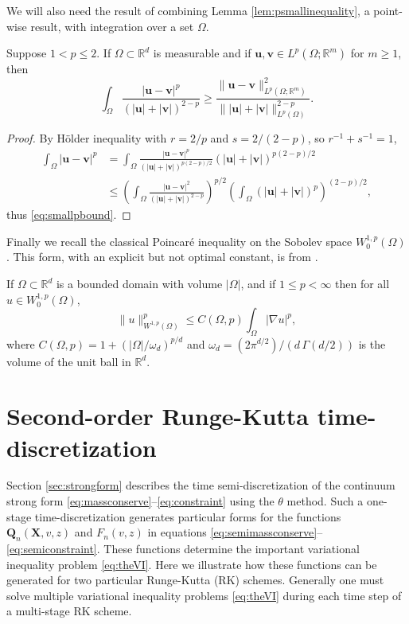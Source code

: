\documentclass[final,onefignum]{siamart190516}
\newcommand\bu{\mathbf{u}}
\newcommand\bv{\mathbf{v}}
\newcommand\bQ{\mathbf{Q}}
\newcommand\bX{\mathbf{X}}
\newcommand{\grad}{\nabla}
\newcommand\RR{\mathbb{R}}
\begin{document}
We will also need the result of combining Lemma \ref{lem:psmallinequality}, a point-wise result, with integration over a set $\Omega$.

\begin{lemma} \label{lem:smallpbound}  Suppose $1<p\le 2$.  If $\Omega \subset \RR^d$ is measurable and if $\bu,\bv\in L^p(\Omega; \RR^m)$ for $m\ge 1$, then
\begin{equation}
    \int_\Omega \frac{|\bu-\bv|^p}{\left(|\bu|+|\bv|\right)^{2-p}} \ge \frac{\|\bu-\bv\|_{L^p(\Omega; \RR^m)}^2}{\big\||\bu|+|\bv|\big\|_{L^p(\Omega)}^{2-p}}. \label{eq:smallpbound}
\end{equation}
\end{lemma}

\begin{proof}  By H\"older inequality with $r=2/p$ and $s=2/(2-p)$, so $r^{-1}+s^{-1}=1$,
\begin{align*}
\int_\Omega |\bu - \bv|^p &= \int_\Omega \frac{|\bu-\bv|^p}{\left(|\bu|+|\bv|\right)^{p(2-p)/2}} \left(|\bu|+|\bv|\right)^{p(2-p)/2} \\
    &\le \left(\int_\Omega \frac{|\bu-\bv|^2}{\left(|\bu|+|\bv|\right)^{2-p}}\right)^{p/2} \left(\int_\Omega \left(|\bu|+|\bv|\right)^p\right)^{(2-p)/2},
\end{align*}
thus \eqref{eq:smallpbound}.
\end{proof}

Finally we recall the classical Poincar\'e inequality on the Sobolev space $W_0^{1,p}(\Omega)$.  This form, with an explicit but not optimal constant, is from \cite[section 7.8]{GilbargTrudinger2001}.

\begin{lemma} \label{lem:poincare}  If $\Omega\subset \RR^d$ is a bounded domain with volume $|\Omega|$, and if $1\le p<\infty$ then for all $u\in W_0^{1,p}(\Omega)$,
\begin{equation}
  \|u\|_{W^{1,p}(\Omega)}^p \le C(\Omega,p) \int_\Omega |\grad u|^p, \label{eq:poincare}
\end{equation}
where $C(\Omega,p)=1+(|\Omega|/\omega_d)^{p/d}$ and $\omega_d=(2 \pi^{d/2})/(d\,\Gamma(d/2))$ is the volume of the unit ball in $\RR^d$.
\end{lemma}


\section{Second-order Runge-Kutta time-discretization}  \label{app:rk2}  Section \ref{sec:strongform} describes the time semi-discretization of the continuum strong form \eqref{eq:massconserve}--\eqref{eq:constraint} using the $\theta$ method.  Such a one-stage time-discretization generates particular forms for the functions $\bQ_n(\bX,v,z)$ and $F_n(v,z)$ in equations \eqref{eq:semimassconserve}--\eqref{eq:semiconstraint}.  These functions determine the important variational inequality problem \eqref{eq:theVI}.  Here we illustrate how these functions can be generated for two particular Runge-Kutta (RK) schemes.  Generally one must solve multiple variational inequality problems \eqref{eq:theVI} during each time step of a multi-stage RK scheme.
\end{document}
